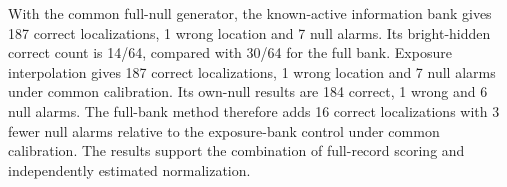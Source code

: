 With the common full-null generator, the known-active information bank gives 187 correct localizations, 1 wrong location and 7 null alarms. Its bright-hidden correct count is 14/64, compared with 30/64 for the full bank. Exposure interpolation gives 187 correct localizations, 1 wrong location and 7 null alarms under common calibration. Its own-null results are 184 correct, 1 wrong and 6 null alarms. The full-bank method therefore adds 16 correct localizations with 3 fewer null alarms relative to the exposure-bank control under common calibration. The results support the combination of full-record scoring and independently estimated normalization.
